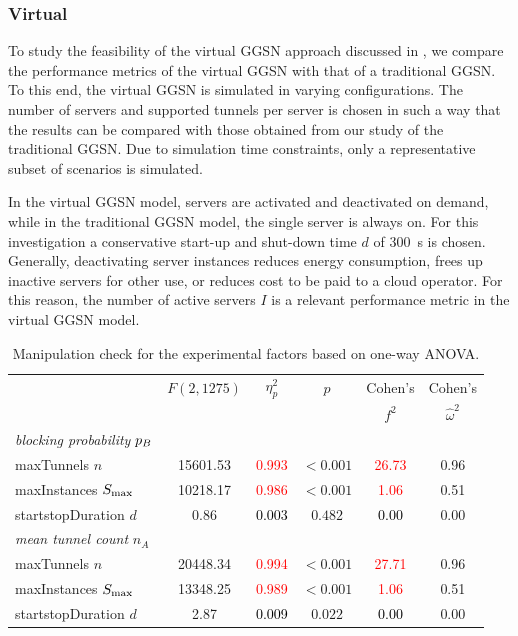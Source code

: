 \subsubsection*{Virtual }\label{sec:cloud:virtualized_network_functions:performance_evaluation:virtual_ggsn}

To study the feasibility of the virtual \gls{GGSN} approach discussed in , we compare the performance metrics of the virtual \gls{GGSN} with that of a traditional \gls{GGSN}.
To this end, the virtual \gls{GGSN} is simulated in varying configurations.
The number of servers and supported tunnels per server is chosen in such a way that the results can be compared with those obtained from our study of the traditional \gls{GGSN}.
Due to simulation time constraints, only a representative subset of scenarios is simulated.

In the virtual \gls{GGSN} model, servers are activated and deactivated on demand, while in the traditional \gls{GGSN} model, the single server is always on.
For this investigation a conservative start-up and shut-down time \(d\) of \SI{300}{\second} is chosen.
Generally, deactivating server instances reduces energy consumption, frees up inactive servers for other use, or reduces cost to be paid to a cloud operator.
For this reason, the number of active servers \(I\) is a relevant performance metric in the virtual \gls{GGSN} model.

\begin{table}\caption{Manipulation check for the experimental factors based on one-way ANOVA.}
\centering
\label{tab:cloud:virtualized_network_functions:performance_evaluation:virtual_ggsn:manipulation}
\tabcolsep=0.11cm
\begin{tabular}{lccccc}
\toprule
& \(F(2,1275)\) & \(\eta^2_p\) & \(p\) & Cohen's & Cohen's\\ 
&  & & & \(f^2\) & \(\hat{\omega}^2\) \\ 
\midrule
\emph{blocking probability} \(p_B\)  & & & & &\\ 
maxTunnels \(n\)&  15601.53 & \textcolor{red}{0.993} & $<0.001$ & \textcolor{red}{26.73} & 0.96\\ 
maxInstances \(S_{\max}\)&  10218.17 & \textcolor{red}{0.986} & $<0.001$ & \textcolor{red}{1.06} & 0.51\\ 
startstopDuration \(d\) &  0.86 & \textcolor{black}{0.003} & $0.482$ & \textcolor{black}{0.00} & 0.00\\ 
\midrule
\emph{mean tunnel count} \(n_A\) & & & & &\\ 
maxTunnels \(n\)&  20448.34 & \textcolor{red}{0.994} & $<0.001$ & \textcolor{red}{27.71} & 0.96\\ 
maxInstances \(S_{\max}\)&  13348.25 & \textcolor{red}{0.989} & $<0.001$ & \textcolor{red}{1.06} & 0.51\\ 
startstopDuration \(d\) &  2.87 & \textcolor{black}{0.009} & $0.022$ & \textcolor{black}{0.00} & 0.00\\ 
\bottomrule
\end{tabular}
\end{table}

